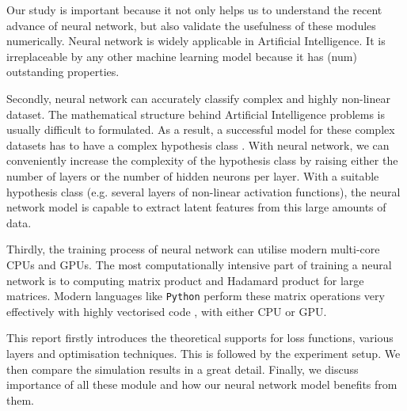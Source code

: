 Our study is important because it not only helps us to understand the recent advance of neural network,  but also validate the usefulness of these modules numerically. Neural network is widely applicable in Artificial Intelligence. It is irreplaceable by any other machine learning model because it has (num) outstanding properties.   

Secondly, neural network can accurately classify complex and highly non-linear dataset. The mathematical structure behind Artificial Intelligence problems is usually difficult to formulated. As a result, a successful model for these complex datasets has to have a complex hypothesis class \citep{Bishop:2006:PRM:1162264}. 
With neural network, we can conveniently increase the complexity of the hypothesis class by raising either the number of layers or the number of hidden neurons per layer. 
With a suitable hypothesis class (e.g. several layers of non-linear activation functions), the neural network model is capable to extract latent features from this large amounts of data.

Thirdly, the training process of neural network can utilise modern multi-core CPUs and GPUs. The most computationally intensive part of training a neural network is to computing matrix product and Hadamard product for large matrices. Modern languages like \texttt{Python} perform these matrix operations very effectively with highly vectorised code \citet{5452452}, with either CPU or GPU.





This report firstly introduces the theoretical supports for loss functions, various layers and optimisation techniques. 
This is followed by the experiment setup. We then compare the simulation results in a great detail.
Finally, we discuss importance of all these module and how our neural network model benefits from them.
